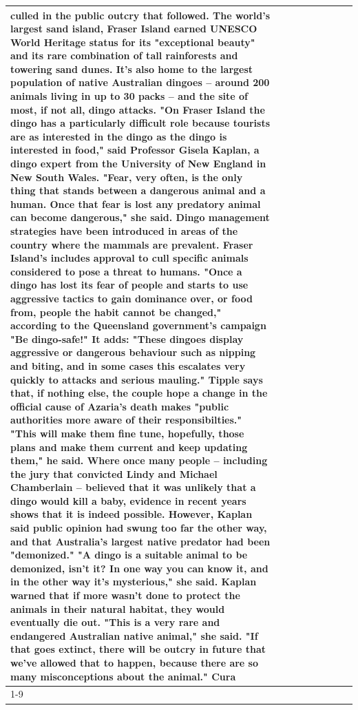 \begin{table}[H]
\begin{tabular}{lllrlllll}
culled in the public outcry that followed. The world's largest sand island, Fraser Island earned UNESCO World Heritage status for its "exceptional beauty" and its rare combination of tall rainforests and towering sand dunes. It's also home to the largest population of native Australian dingoes -- around 200 animals living in up to 30 packs -- and the site of most, if not all, dingo attacks. "On Fraser Island the dingo has a particularly difficult role because tourists are as interested in the dingo as the dingo is interested in food," said Professor Gisela Kaplan, a dingo expert from the University of New England in New South Wales. "Fear, very often, is the only thing that stands between a dangerous animal and a human. Once that fear is lost any predatory animal can become dangerous," she said. Dingo management strategies have been introduced in areas of the country where the mammals are prevalent. Fraser Island's includes approval to cull specific animals considered to pose a threat to humans. "Once a dingo has lost its fear of people and starts to use aggressive tactics to gain dominance over, or food from, people the habit cannot be changed," according to the Queensland government's campaign "Be dingo-safe!" It adds: "These dingoes display aggressive or dangerous behaviour such as nipping and biting, and in some cases this escalates very quickly to attacks and serious mauling." Tipple says that, if nothing else, the couple hope a change in the official cause of Azaria's death makes "public authorities more aware of their responsibilties." "This will make them fine tune, hopefully, those plans and make them current and keep updating them," he said. Where once many people -- including the jury that convicted Lindy and Michael Chamberlain -- believed that it was unlikely that a dingo would kill a baby, evidence in recent years shows that it is indeed possible. However, Kaplan said public opinion had swung too far the other way, and that Australia's largest native predator had been "demonized." "A dingo is a suitable animal to be demonized, isn't it? In one way you can know it, and in the other way it's mysterious," she said. Kaplan warned that if more wasn't done to protect the animals in their natural habitat, they would eventually die out. "This is a very rare and endangered Australian native animal," she said. "If that goes extinct, there will be outcry in future that we've allowed that to happen, because there are so many misconceptions about the animal." Cura \\
\cline{1-9}

\end{tabular}
\end{table}
